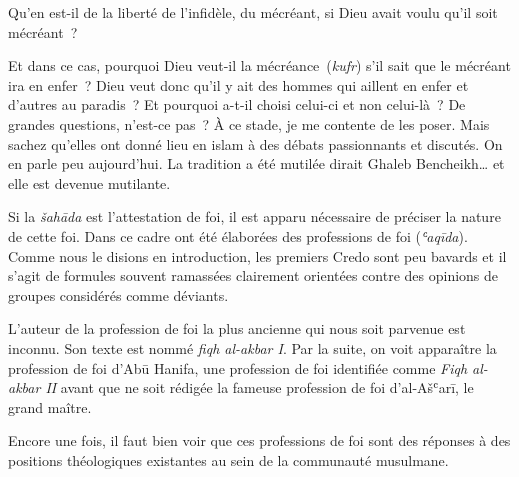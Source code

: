Qu'en est-il de la liberté de l'infidèle, du mécréant, si Dieu avait
voulu qu'il soit mécréant~?

Et dans ce cas, pourquoi Dieu veut-il la mécréance~(\emph{kufr}) s'il
sait que le mécréant ira en enfer~? Dieu veut donc qu'il y ait des
hommes qui aillent en enfer et d'autres au paradis~? Et pourquoi a-t-il
choisi celui-ci et non celui-là~? De grandes questions, n'est-ce pas~? À
ce stade, je me contente de les poser. Mais sachez qu'elles ont donné
lieu en islam à des débats passionnants et discutés. On en parle peu
aujourd'hui. La tradition a été mutilée dirait Ghaleb Bencheikh\ldots{}
et elle est devenue mutilante.






Si la \emph{šahāda} est l'attestation de foi, il est apparu nécessaire
de préciser la nature de cette foi. Dans ce cadre ont été élaborées des
professions de foi (\emph{ʿaqīda}). Comme nous le disions en
introduction, les premiers Credo sont peu bavards et il s'agit de
formules souvent ramassées clairement orientées contre des opinions de
groupes considérés comme déviants.

L'auteur de la profession de foi la plus ancienne qui nous soit parvenue
est inconnu. Son texte est nommé \emph{fiqh al-akbar I}. Par la suite,
on voit apparaître la profession de foi d'Abū Hanifa, une profession de
foi identifiée comme \emph{Fiqh al-akbar II} avant que ne soit rédigée
la fameuse profession de foi d'al-Ašʿarī, le grand maître.

Encore une fois, il faut bien voir que ces professions de foi sont des
réponses à des positions théologiques existantes au sein de la
communauté musulmane.



